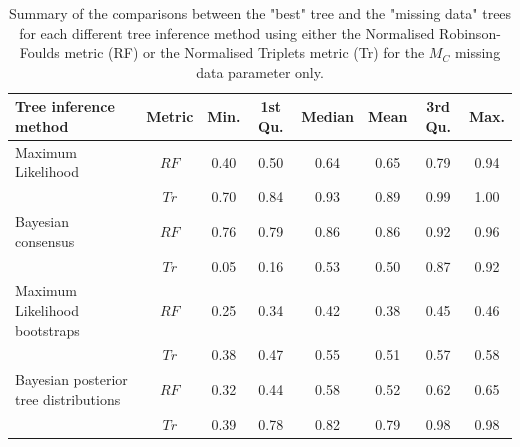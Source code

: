 \documentclass[12pt,letterpaper]{article}
\begin{document}
\begin{landscape}
\begin{table}[ht]
\caption{Summary of the comparisons between the "best" tree and the "missing data" trees for each different tree inference method using either the Normalised Robinson-Foulds metric (RF) or the Normalised Triplets metric (Tr) for the $M_{C}$ missing data parameter only.}
\label{Tab_Supp_summary_metric_MC}
\centering
\begin{tabular}{lccccccc}
  \hline
 Tree inference method & Metric & Min. & 1st Qu. & Median & Mean & 3rd Qu. & Max. \\ 
  \hline
  Maximum Likelihood                    & $RF$ & 0.40 & 0.50 & 0.64 & 0.65 & 0.79 & 0.94 \\ 
                                        & $Tr$ & 0.70 & 0.84 & 0.93 & 0.89 & 0.99 & 1.00 \\ 
  Bayesian consensus                    & $RF$ & 0.76 & 0.79 & 0.86 & 0.86 & 0.92 & 0.96 \\ 
                                        & $Tr$ & 0.05 & 0.16 & 0.53 & 0.50 & 0.87 & 0.92 \\ 
  Maximum Likelihood bootstraps         & $RF$ & 0.25 & 0.34 & 0.42 & 0.38 & 0.45 & 0.46 \\ 
                                        & $Tr$ & 0.38 & 0.47 & 0.55 & 0.51 & 0.57 & 0.58 \\ 
  Bayesian posterior tree distributions & $RF$ & 0.32 & 0.44 & 0.58 & 0.52 & 0.62 & 0.65 \\ 
                                        & $Tr$ & 0.39 & 0.78 & 0.82 & 0.79 & 0.98 & 0.98 \\ 
   \hline
\end{tabular}
\end{table}
\end{landscape}
\end{document}
